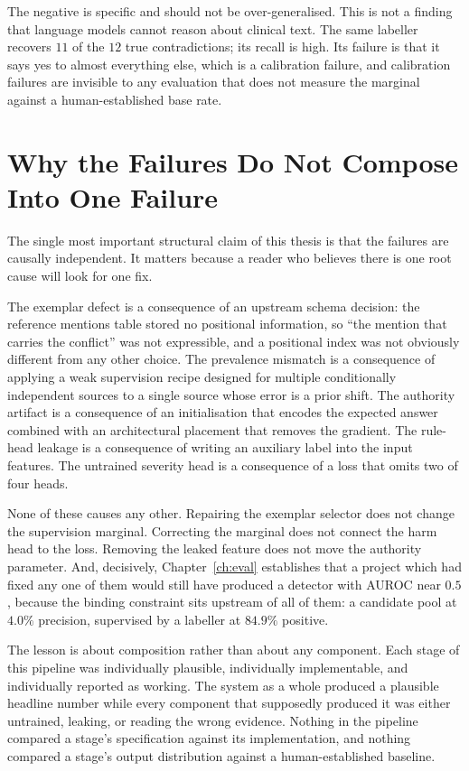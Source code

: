 The negative is specific and should not be over-generalised. This is not a
finding that language models cannot reason about clinical text. The same
labeller recovers $11$ of the $12$ true contradictions; its recall is high. Its
failure is that it says yes to almost everything else, which is a calibration
failure, and calibration failures are invisible to any evaluation that does not
measure the marginal against a human-established base rate.

\section{Why the Failures Do Not Compose Into One Failure}
\label{sec:disc-independence}

The single most important structural claim of this thesis is that the failures
are causally independent. It matters because a reader who believes there is one
root cause will look for one fix.

The exemplar defect is a consequence of an upstream schema decision: the
reference mentions table stored no positional information, so ``the mention that
carries the conflict'' was not expressible, and a positional index was not
obviously different from any other choice. The prevalence mismatch is a
consequence of applying a weak supervision recipe designed for multiple
conditionally independent sources to a single source whose error is a prior
shift. The authority artifact is a consequence of an initialisation that encodes
the expected answer combined with an architectural placement that removes the
gradient. The rule-head leakage is a consequence of writing an auxiliary label
into the input features. The untrained severity head is a consequence of a loss
that omits two of four heads.

None of these causes any other. Repairing the exemplar selector does not change
the supervision marginal. Correcting the marginal does not connect the harm head
to the loss. Removing the leaked feature does not move the authority parameter.
And, decisively, Chapter~\ref{ch:eval} establishes that a project which had
fixed any one of them would still have produced a detector with AUROC near
$0.5$, because the binding constraint sits upstream of all of them: a candidate
pool at $4.0\%$ precision, supervised by a labeller at $84.9\%$ positive.

The lesson is about composition rather than about any component. Each stage of
this pipeline was individually plausible, individually implementable, and
individually reported as working. The system as a whole produced a plausible
headline number while every component that supposedly produced it was either
untrained, leaking, or reading the wrong evidence. Nothing in the pipeline
compared a stage's specification against its implementation, and nothing
compared a stage's output distribution against a human-established baseline.

